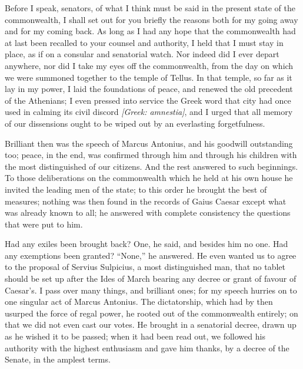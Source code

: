 
 Before I speak, senators, of what I think must be said in the present state of the commonwealth, I shall set out for you briefly the reasons both for my going away and for my coming back. As long as I had any hope that the commonwealth had at last been recalled to your counsel and authority, I held that I must stay in place, as if on a consular and senatorial watch. Nor indeed did I ever depart anywhere, nor did I take my eyes off the commonwealth, from the day on which we were summoned together to the temple of Tellus. In that temple, so far as it lay in my power, I laid the foundations of peace, and renewed the old precedent of the Athenians; I even pressed into service the Greek word that city had once used in calming its civil discord \textit{[Greek: amnestia]}, and I urged that all memory of our dissensions ought to be wiped out by an everlasting forgetfulness.

 Brilliant then was the speech of Marcus Antonius, and his goodwill outstanding too; peace, in the end, was confirmed through him and through his children with the most distinguished of our citizens. And the rest answered to such beginnings. To those deliberations on the commonwealth which he held at his own house he invited the leading men of the state; to this order he brought the best of measures; nothing was then found in the records of Gaius Caesar except what was already known to all; he answered with complete consistency the questions that were put to him.

 Had any exiles been brought back? One, he said, and besides him no one. Had any exemptions been granted? ``None,'' he answered. He even wanted us to agree to the proposal of Servius Sulpicius, a most distinguished man, that no tablet should be set up after the Ides of March bearing any decree or grant of favour of Caesar's. I pass over many things, and brilliant ones; for my speech hurries on to one singular act of Marcus Antonius. The dictatorship, which had by then usurped the force of regal power, he rooted out of the commonwealth entirely; on that we did not even cast our votes. He brought in a senatorial decree, drawn up as he wished it to be passed; when it had been read out, we followed his authority with the highest enthusiasm and gave him thanks, by a decree of the Senate, in the amplest terms.

